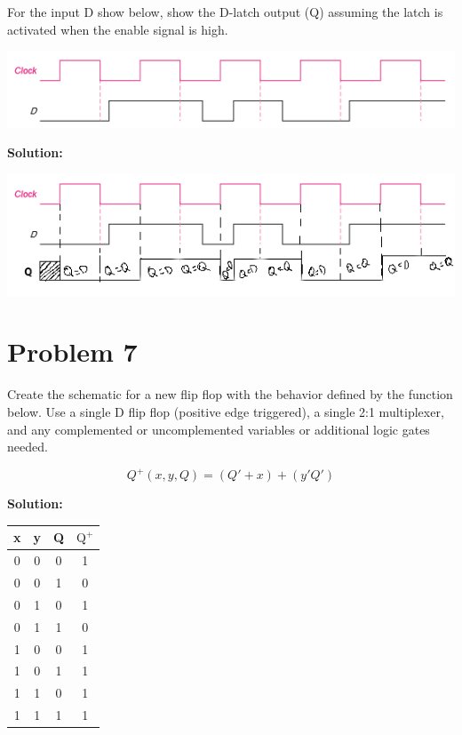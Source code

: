 \documentclass{article}
\begin{document}
    For the input D show below, show the D-latch output (Q) assuming the latch is 
    activated when the enable signal is high.

    \begin{center}
        \includegraphics[width=\linewidth]{HW4_q6.png}
    \end{center}

    \textbf{Solution:}

    \begin{center}
        \includegraphics[width=\linewidth]{HW4_q6_s.png}
    \end{center}


    \section*{Problem 7}

    Create the schematic for a new flip flop with the behavior defined by the function 
    below. Use a single D flip flop (positive edge triggered), a single 2:1 multiplexer, 
    and any complemented or uncomplemented variables or additional logic gates needed.

    \[Q^+(x,y,Q)=(Q'+x)+(y'Q')\]

    \textbf{Solution:}

    \begin{center}
        \begin{tabular} {ccc|c}
            x & y & Q & $\text{Q}^+$ \\
            \hline
            0 & 0 & 0 & 1 \\
            0 & 0 & 1 & 0 \\
            0 & 1 & 0 & 1 \\
            0 & 1 & 1 & 0 \\
            1 & 0 & 0 & 1 \\
            1 & 0 & 1 & 1 \\
            1 & 1 & 0 & 1 \\
            1 & 1 & 1 & 1 \\
        \end{tabular}
    \end{center}
\end{document}
